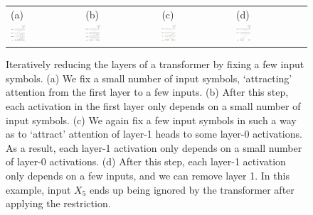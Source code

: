 \documentclass[11pt,a4paper]{article}
\begin{document}
\begin{figure}[ht]
    \centering
    \begin{tabular}{llll}
    (a) & (b) & (c) & (d) \\
    \includegraphics[width=0.23\textwidth]{figures/sa1.png} &
        \includegraphics[width=0.23\textwidth]{figures/sa2.png}&
    \includegraphics[width=0.23\textwidth]{figures/sa3.png} &
        \includegraphics[width=0.23\textwidth]{figures/sa4.png}
        \end{tabular}
	\caption{Iteratively reducing the layers of a transformer by fixing a few input symbols. (a) We fix a small number of input symbols, `attracting' attention from the first layer to a few inputs. (b) After this step, each activation in the first layer only depends on a small number of input symbols. (c) We again fix a few input symbols in such a way as to `attract' attention of layer-1 heads to some layer-0 activations. As a result, each layer-1 activation only depends on a small number of layer-0 activations. (d) After this step, each layer-1 activation only depends on a few inputs, and we can remove layer 1. In this example, input $X_5$ ends up being ignored by the transformer after applying the restriction.}
	\label{fig:depth-reduction}
\end{figure}
\end{document}

